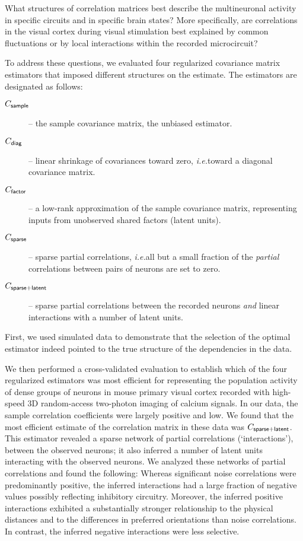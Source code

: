 What structures of correlation matrices best describe the multineuronal activity in specific circuits and in specific brain states?  More specifically, are correlations in the visual cortex during visual stimulation best explained by common fluctuations or by local interactions within the recorded microcircuit?

To address these questions, we evaluated four regularized covariance matrix estimators that imposed different structures on the estimate. The estimators are designated as follows:
\begin{description}
\item[$C_{\sf sample}$] -- the sample covariance matrix, the unbiased estimator.
\item[$C_{\sf diag}$] -- linear shrinkage of covariances toward zero, \emph{i.e.}\;toward a diagonal covariance matrix.
\item[$C_{\sf factor}$] -- a low-rank approximation of the sample covariance matrix, representing inputs from unobserved shared factors (latent units).
\item[$C_{\sf sparse}$] -- sparse partial correlations, \emph{i.e.}\;all but a small fraction of the \emph{partial} correlations between pairs of neurons are set to zero.
\item[$C_{\sf sparse+latent}$] -- sparse partial correlations between the recorded neurons \emph{and} linear interactions with a number of latent units.
\end{description}

First, we used simulated data to demonstrate that the selection of the optimal estimator indeed pointed to the true structure of the dependencies in the data.

We then performed a cross-validated evaluation to establish which of the four regularized estimators was most efficient for representing the population activity of dense groups of neurons in mouse primary visual cortex recorded with high-speed 3D random-access two-photon imaging of calcium signals. In our data, the sample correlation coefficients were largely positive and low.  We found that the most efficient estimate of the correlation matrix in these data was $C_{\sf sparse+latent}$.  This estimator revealed a sparse network of partial correlations (`interactions'), between the observed neurons; it also inferred a number of latent units interacting with the observed neurons. We analyzed these networks of partial correlations and found the following: Whereas significant noise correlations were predominantly positive, the inferred interactions had a large fraction of negative values possibly reflecting inhibitory circuitry.  Moreover, the inferred positive interactions exhibited a substantially stronger relationship to the physical distances and to the differences in preferred orientations than noise correlations. In contrast, the inferred negative interactions were less selective.

